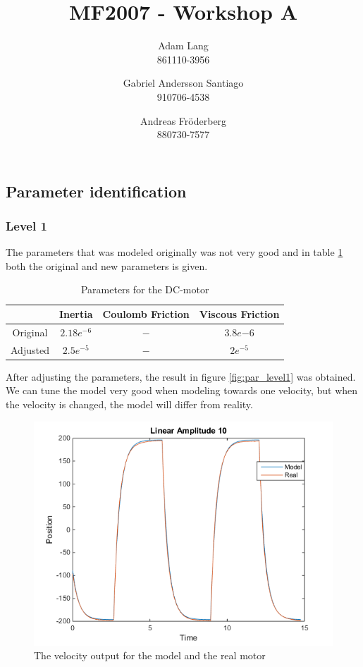 \documentclass[12pt,a4paper]{article}
\title{MF2007 - Workshop A}
\author{
Adam Lang \\ 861110-3956
\and
Gabriel Andersson Santiago \\ 910706-4538
\and 
Andreas Fr\"oderberg \\ 880730-7577
}
\begin{document}
\maketitle

\subsection*{Parameter identification}

\subsubsection*{Level 1}
The parameters that was modeled originally was not very good and in
table \ref{tab:parameters} both the original and new parameters is
given.
\begin{center}
  \begin{table}[H]
    \caption{Parameters for the DC-motor}
    \begin{tabular}{|c|c|c|c|}
        \hline
        & Inertia & Coulomb Friction & Viscous Friction \\ 
        \hline
        Original & $2.18e^{-6}$ & $-$ & $3.8e{-6}$ \\
        \hline
        Adjusted & $2.5e^{-5}$ & $-$ & $2e^{-5}$ \\
        \hline
    \end{tabular}
   \label{tab:parameters}
  \end{table}
\end{center}
After adjusting the parameters, the result in figure
\ref{fig:par_level1} was obtained. We can
tune the model very good when modeling towards one velocity, but when
the velocity is changed, the model will differ from reality.
\begin{center}
    \begin{figure}[H]
    \centering
      \includegraphics[scale = 0.6]{par_level1.png}
      \caption{The velocity output for the model and the real motor}
      \label{fig:par_level1.png}
    \end{figure}
\end{center}
\end{document}
